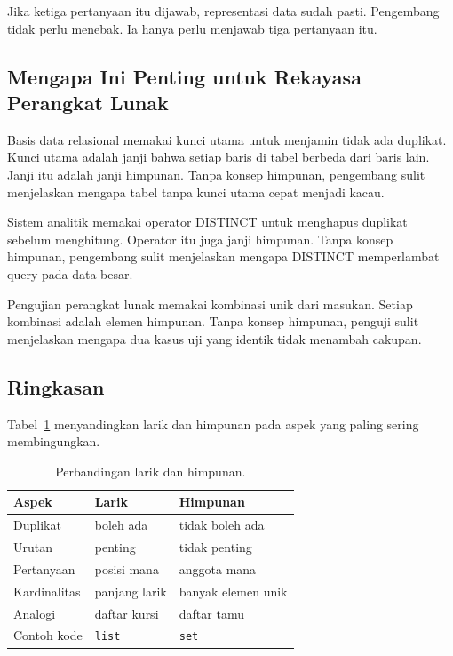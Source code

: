 \documentclass[11pt,a4paper]{article}
\begin{document}
Jika ketiga pertanyaan itu dijawab, representasi data sudah pasti. Pengembang tidak perlu menebak. Ia hanya perlu menjawab tiga pertanyaan itu.

\subsection{Mengapa Ini Penting untuk Rekayasa Perangkat Lunak}

Basis data relasional memakai kunci utama untuk menjamin tidak ada duplikat. Kunci utama adalah janji bahwa setiap baris di tabel berbeda dari baris lain. Janji itu adalah janji himpunan. Tanpa konsep himpunan, pengembang sulit menjelaskan mengapa tabel tanpa kunci utama cepat menjadi kacau.

Sistem analitik memakai operator DISTINCT untuk menghapus duplikat sebelum menghitung. Operator itu juga janji himpunan. Tanpa konsep himpunan, pengembang sulit menjelaskan mengapa DISTINCT memperlambat query pada data besar.

Pengujian perangkat lunak memakai kombinasi unik dari masukan. Setiap kombinasi adalah elemen himpunan. Tanpa konsep himpunan, penguji sulit menjelaskan mengapa dua kasus uji yang identik tidak menambah cakupan.

\subsection{Ringkasan}

Tabel~\ref{tab:larik-himpunan} menyandingkan larik dan himpunan pada aspek yang paling sering membingungkan.

\begin{table}[H]
	\centering
	\caption{Perbandingan larik dan himpunan.}
	\label{tab:larik-himpunan}
	\small
	\begin{tabularx}{\textwidth}{l X X}
		\toprule
		Aspek        & Larik         & Himpunan           \\
		\midrule
		Duplikat     & boleh ada     & tidak boleh ada    \\
		Urutan       & penting       & tidak penting      \\
		Pertanyaan   & posisi mana   & anggota mana       \\
		Kardinalitas & panjang larik & banyak elemen unik \\
		Analogi      & daftar kursi  & daftar tamu        \\
		Contoh kode  & \texttt{list} & \texttt{set}       \\
		\bottomrule
	\end{tabularx}
\end{table}
\end{document}
